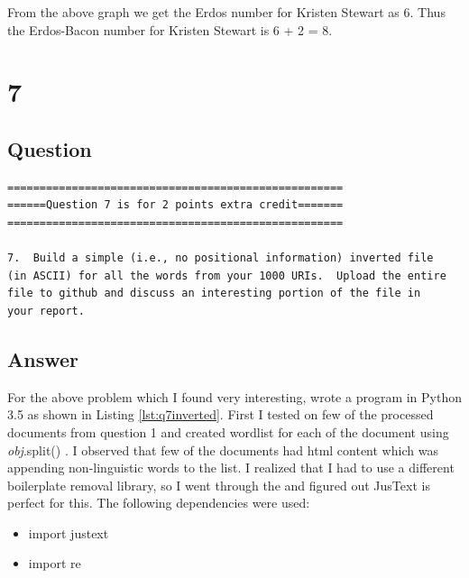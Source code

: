 \documentclass[letterpaper,11pt]{article}
\begin{document}
From the above graph we get the Erdos number for Kristen Stewart as 6. Thus the Erdos-Bacon number for Kristen Stewart is 6 + 2 = 8.

\clearpage



\section*{7}

\subsection*{Question}

\begin{verbatim}
====================================================
======Question 7 is for 2 points extra credit=======
====================================================

7.  Build a simple (i.e., no positional information) inverted file
(in ASCII) for all the words from your 1000 URIs.  Upload the entire
file to github and discuss an interesting portion of the file in
your report.
\end{verbatim}

\clearpage
\subsection*{Answer}

For the above problem which I found very interesting, wrote a program in Python 3.5 as shown in Listing \ref{lst:q7inverted}. First I tested on few of the processed documents from question 1 and created wordlist for each of the document using \emph{obj}.split() \cite{countingref}. I observed that few of the documents had html content which was appending non-linguistic words to the list. I realized that I had to use a different boilerplate removal library, so I went through the \cite{boilerpiperef} and figured out JusText \cite{githubref} is perfect for this. The following dependencies were used:

\begin{itemize}
    \item import justext
    \item import re

\end{itemize}



\end{document}
